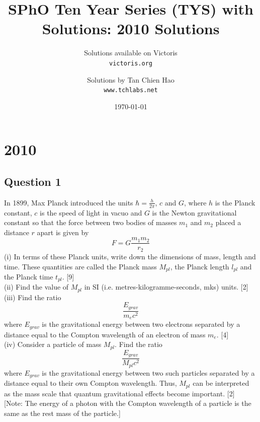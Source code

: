\documentclass{article}
\title{SPhO Ten Year Series (TYS) with Solutions: 2010 Solutions}
\author{
    Solutions available on Victoris\\
    \texttt{victoris.org}
    \and 
    Solutions by Tan Chien Hao\\
    \texttt{www.tchlabs.net}
}
\date{\today}
\begin{document}
\maketitle

\section{2010}
\subsection{Question 1}
In 1899, Max Planck introduced the units $\hbar=\frac{h}{2\pi}$, $c$ and $G$, where $h$ is the Planck constant, $c$ is the speed of light in vacuo and $G$ is the Newton gravitational constant so that the force between two bodies of masses $m_1$ and $m_2$ placed a distance $r$ apart is given by 
\[F=G\frac{m_1 m_2}{r_2}\]
(i) In terms of these Planck units, write down the dimensions of mass, length and time. These quantities are called the Planck mass $M_{pl}$, the Planck length $l_{pl}$ and the Planck time $t_{pl}$. [9]\\
(ii) Find the value of $M_{pl}$ in SI (i.e. metres-kilogramme-seconds, mks) units. [2] \\
(iii) Find the ratio
 \[\frac{E_{grav}}{m_e c^2}\] where $E_{grav}$ is the gravitational energy between two electrons separated by a distance equal to the Compton wavelength of an electron of mass $m_e$. [4] \\
(iv) Consider a particle of mass $M_{pl}$. Find the ratio \[\frac{E_{grav}}{M_{pl} c^2}\] where $E_{grav}$  is the gravitational energy between two such particles separated by a distance equal to their own Compton wavelength. Thus, $M_{pl}$ can be interpreted as the mass scale that quantum gravitational effects become important. [2] \\

[Note: The energy of a photon with the Compton wavelength of a particle is the same as the rest mass of the particle.] 
\end{document}
